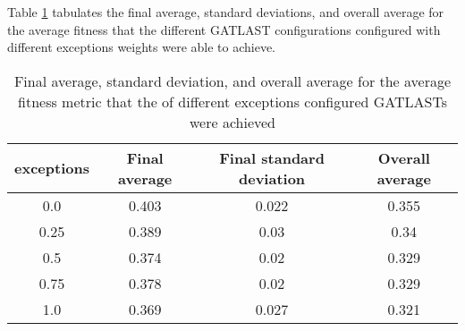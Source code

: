 Table \ref{tab:HP:GA:Exceptions:average fitness} tabulates the final average, standard deviations, and overall average for the average fitness that the different GATLAST configurations configured with different exceptions weights were able to achieve.
\begin{table}[tbh!]
\centering
\begin{adjustbox}{trim=0cm 0cm 0cm 0cm, clip=true}
\begin{tabular}{|c|c|c|c|}
\hline
exceptions & Final average & Final standard deviation & Overall average\\
\hline
0.0 & 0.403 & 0.022 & 0.355\\\hline
0.25 & 0.389 & 0.03 & 0.34\\\hline
0.5 & 0.374 & 0.02 & 0.329\\\hline
0.75 & 0.378 & 0.02 & 0.329\\\hline
1.0 & 0.369 & 0.027 & 0.321\\\hline
\end{tabular}
\end{adjustbox}
\caption{Final average, standard deviation, and overall average for the average fitness metric that the of different exceptions configured GATLASTs were achieved}
\label{tab:HP:GA:Exceptions:average fitness}
\end{table}